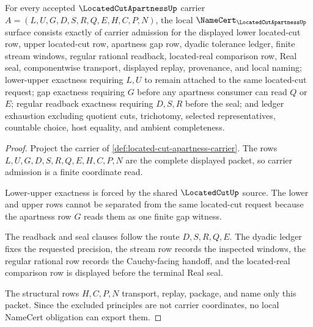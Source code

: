 \begin{theorem}
\label{thm:located-cut-apartness-namecert-obligations}
For every accepted $\LocatedCutApartnessUp$ carrier $A=(L,U,G,D,S,R,Q,E,H,C,P,N)$, the local $\NameCert_{\LocatedCutApartnessUp}$ surface consists exactly of carrier admission for the displayed lower located-cut row, upper located-cut row, apartness gap row, dyadic tolerance ledger, finite stream windows, regular rational readback, located-real comparison row, Real seal, componentwise transport, displayed replay, provenance, and local naming; lower-upper exactness requiring $L,U$ to remain attached to the same located-cut request; gap exactness requiring $G$ before any apartness consumer can read $Q$ or $E$; regular readback exactness requiring $D,S,R$ before the seal; and ledger exhaustion excluding quotient cuts, trichotomy, selected representatives, countable choice, host equality, and ambient completeness.
\end{theorem}
\begin{proof}
Project the carrier of \autoref{def:located-cut-apartness-carrier}. The rows $L,U,G,D,S,R,Q,E,H,C,P,N$ are the complete displayed packet, so carrier admission is a finite coordinate read.

Lower-upper exactness is forced by the shared $\LocatedCutUp$ source. The lower and upper rows cannot be separated from the same located-cut request because the apartness row $G$ reads them as one finite gap witness.

The readback and seal clauses follow the route $D,S,R,Q,E$. The dyadic ledger fixes the requested precision, the stream row records the inspected windows, the regular rational row records the Cauchy-facing handoff, and the located-real comparison row is displayed before the terminal Real seal.

The structural rows $H,C,P,N$ transport, replay, package, and name only this packet. Since the excluded principles are not carrier coordinates, no local NameCert obligation can export them.
\end{proof}

